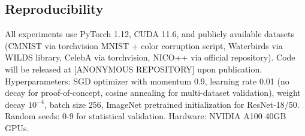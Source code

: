 \subsection{Reproducibility}

All experiments use PyTorch 1.12, CUDA 11.6, and publicly available datasets (CMNIST via torchvision MNIST + color corruption script, Waterbirds via WILDS library, CelebA via torchvision, NICO++ via official repository). Code will be released at [ANONYMOUS REPOSITORY] upon publication. Hyperparameters: SGD optimizer with momentum 0.9, learning rate 0.01 (no decay for proof-of-concept, cosine annealing for multi-dataset validation), weight decay $10^{-4}$, batch size 256, ImageNet pretrained initialization for ResNet-18/50. Random seeds: 0-9 for statistical validation. Hardware: NVIDIA A100 40GB GPUs.
